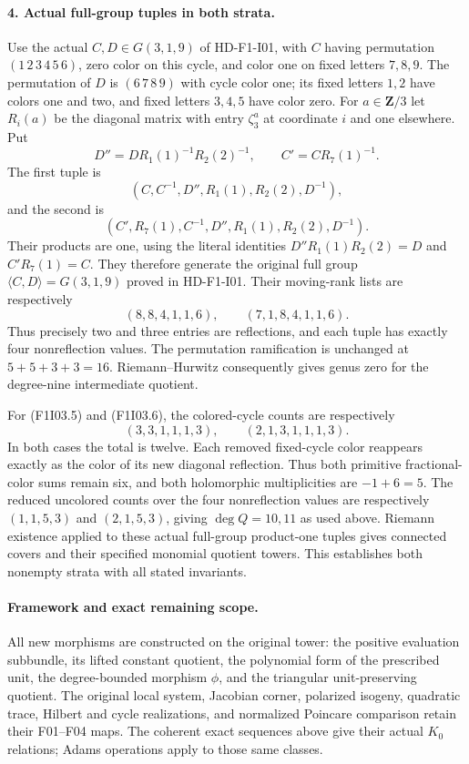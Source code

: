 \paragraph{4. Actual full-group tuples in both strata.}
Use the actual $C,D\in G(3,1,9)$ of HD-F1-I01, with
$C$ having permutation $(1\,2\,3\,4\,5\,6)$, zero color
on this cycle, and color one on fixed letters $7,8,9$.
The permutation of $D$ is $(6\,7\,8\,9)$ with cycle
color one; its fixed letters $1,2$ have colors one and
two, and fixed letters $3,4,5$ have color zero.
For $a\in\mathbf Z/3$ let $R_i(a)$ be the diagonal matrix
with entry $\zeta_3^a$ at coordinate $i$ and one elsewhere.
Put
\[
 D''=D R_1(1)^{-1}R_2(2)^{-1},\qquad
 C'=C R_7(1)^{-1}.
\]
The first tuple is
\[
       (C,C^{-1},D'',R_1(1),R_2(2),D^{-1}),          \tag{F1I03.5}
\]
and the second is
\[
       (C',R_7(1),C^{-1},D'',R_1(1),R_2(2),D^{-1}). \tag{F1I03.6}
\]
Their products are one, using the literal identities
$D''R_1(1)R_2(2)=D$ and $C'R_7(1)=C$.
They therefore generate the original full group
$\langle C,D\rangle=G(3,1,9)$ proved in HD-F1-I01.
Their moving-rank lists are respectively
\[
           (8,8,4,1,1,6),\qquad (7,1,8,4,1,1,6).
\]
Thus precisely two and three entries are reflections,
and each tuple has exactly four nonreflection values.
The permutation ramification is unchanged at
$5+5+3+3=16$. Riemann--Hurwitz consequently gives
genus zero for the degree-nine intermediate quotient.

For (F1I03.5) and (F1I03.6), the colored-cycle counts are
respectively
\[
 (3,3,1,1,1,3),\qquad (2,1,3,1,1,1,3).
\]
In both cases the total is twelve.
Each removed fixed-cycle color reappears exactly as the
color of its new diagonal reflection. Thus both primitive
fractional-color sums remain six, and both holomorphic
multiplicities are $-1+6=5$.
The reduced uncolored counts over the four nonreflection
values are respectively $(1,1,5,3)$ and $(2,1,5,3)$,
giving $\deg Q=10,11$ as used above.
Riemann existence applied to these actual full-group
product-one tuples gives connected covers and their
specified monomial quotient towers. This establishes
both nonempty strata with all stated invariants.

\paragraph{Framework and exact remaining scope.}
All new morphisms are constructed on the original tower:
the positive evaluation subbundle, its lifted constant
quotient, the polynomial form of the prescribed unit,
the degree-bounded morphism $\phi$, and the triangular
unit-preserving quotient. The original local system,
Jacobian corner, polarized isogeny, quadratic trace,
Hilbert and cycle realizations, and normalized Poincare
comparison retain their F01--F04 maps. The coherent
exact sequences above give their actual $K_0$ relations;
Adams operations apply to those same classes.

